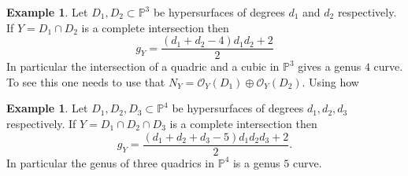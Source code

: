 \documentclass[12pt]{article}
\numberwithin{equation}{section}
\theoremstyle{definition}
\newtheorem{example}[theorem]{Example}
\theoremstyle{remark}
\newcommand{\Ocal}{\mathcal{O}}
\newcommand{\PP}{\mathbb{P}}
\begin{document}
\begin{example}
	Let $D_1,D_2 \subset \PP^3$ be hypersurfaces of degrees $d_1$ and $d_2$ respectively. 
	If $Y=D_1\cap D_2$ is a complete intersection then 
	$$g_Y = \frac{(d_1+d_2-4)d_1d_2+2}{2}$$
	In particular the intersection of a quadric and a cubic in $\PP^3$ gives a genus $4$ curve. 
	To see this one needs to use that $N_Y = \Ocal_Y(D_1)\oplus \Ocal_Y(D_2)$. 
	Using how 
\end{example}

\begin{example}
	Let $D_1,D_2,D_3 \subset \PP^4$ be hypersurfaces of degrees $d_1,d_2,d_3$ respectively. 
	If $Y=D_1\cap D_2 \cap D_3$ is a complete intersection then 
	 $$ g_Y = \frac{(d_1+d_2+d_3-5)d_1d_2d_3+2}{2}.$$
	In particular the genus of three quadrics in $\PP^4$ is a genus $5$ curve.
\end{example}
\end{document}
